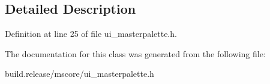 \subsection{Detailed Description}


Definition at line 25 of file ui\+\_\+masterpalette.\+h.



The documentation for this class was generated from the following file\+:\begin{DoxyCompactItemize}
\item 
build.\+release/mscore/ui\+\_\+masterpalette.\+h\end{DoxyCompactItemize}

